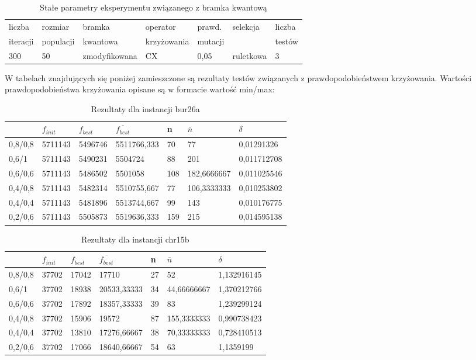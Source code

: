 \begin{table}[H]
\label{T3_params}
\begin{tabular}{l l l l l l l}
\hline
liczba & rozmiar & bramka & operator & prawd. & selekcja & liczba \\
iteracji & populacji & kwantowa & krzyżowania & mutacji & & testów \\
\hline
300 & 50 & zmodyfikowana & CX & 0,05 & ruletkowa & 3 \\
\hline
\end{tabular}
\caption{Stałe parametry eksperymentu związanego z bramka kwantową}
\end{table}

W tabelach znajdujących się poniżej zamieszczone są rezultaty testów związanych z prawdopodobieństwem krzyżowania. Wartości prawdopodobieństwa krzyżowania opisane są w formacie wartość min/max:

\begin{table}[H]
\label{T3_bur26a}
\begin{tabular}{l l l l l l l}
\hline
 & $f_{init}$ & $f_{best}$ & $\overline{f_{best}}$ & n & $\overline{n}$ & $\delta$ \\
\hline
0,8/0,8 & 5711143 & 5496746 & 5511766,333 & 70 & 77 & 0,01291326\\
0,6/1 & 5711143 & 5490231 & 5504724 & 88 & 201 & 0,011712708\\
0,6/0,6 & 5711143 & 5486502 & 5501058 & 108 & 182,6666667 & 0,011025546\\
0,4/0,8 & 5711143 & 5482314 & 5510755,667 & 77 & 106,3333333 & 0,010253802\\
0,4/0,4 & 5711143 & 5481896 & 5513744,667 & 99 & 143 & 0,010176775\\
0,2/0,6 & 5711143 & 5505873 & 5519636,333 & 159 & 215 & 0,014595138\\
\hline
\end{tabular}
\caption{Rezultaty dla instancji bur26a}
\end{table}

\begin{table}[H]
\label{T3_chr15b}
\begin{tabular}{l l l l l l l}
\hline
 & $f_{init}$ & $f_{best}$ & $\overline{f_{best}}$ & n & $\overline{n}$ & $\delta$ \\
\hline
0,8/0,8 & 37702 & 17042 & 17710 & 27 & 52 & 1,132916145\\
0,6/1 & 37702 & 18938 & 20533,33333 & 34 & 44,66666667 & 1,370212766\\
0,6/0,6 & 37702 & 17892 & 18357,33333 & 39 & 83 & 1,239299124\\
0,4/0,8 & 37702 & 15906 & 19572 & 87 & 155,3333333 & 0,990738423\\
0,4/0,4 & 37702 & 13810 & 17276,66667 & 38 & 70,33333333 & 0,728410513\\
0,2/0,6 & 37702 & 17066 & 18640,66667 & 54 & 63 & 1,1359199\\
\hline
\end{tabular}
\caption{Rezultaty dla instancji chr15b}
\end{table}

